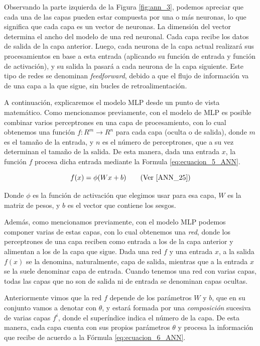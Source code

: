 \documentclass[12pt,a4paper]{article}
\begin{document}
\begin{sloppypar}
Observando la parte izquierda de la Figura \ref{fig:ann_3}, podemos apreciar que cada una de las capas pueden estar compuesta por una o más neuronas, lo que significa que cada capa es un vector de neuronas. La dimensión del vector determina el ancho del modelo de una red neuronal. Cada capa recibe los datos de salida de la capa anterior. Luego, cada neurona de la capa actual realizará sus procesamientos en base a esta entrada (aplicando su función de entrada y función de activación), y su salida la pasará a cada neurona de la capa siguiente. Este tipo de redes se denominan \textit{feedforward}, debido a que el flujo de información va de una capa a la que sigue, sin bucles de retroalimentación. 

A continuación, explicaremos el modelo MLP desde un punto de vista matemático\cite{ANN_25}. Como mencionamos previamente, con el modelo de MLP es posible combinar varios perceptrones en una capa de procesamiento, con lo cual obtenemos una función $f: R^m → R^n$ para cada capa (oculta o de salida), donde $m$ es el tamaño de la entrada, y $n$ es el número de perceptrones, que a su vez determinan el tamaño de la salida. De esta manera, dada una entrada $x$, la función $f$ procesa dicha entrada mediante la Formula \ref{eq:ecuacion_5_ANN}.

\begin{equation}\label{eq:ecuacion_5_ANN}
f(x) = \phi(Wx+b) \qquad  \text{(Ver \cite{ANN_25})}
\end{equation}

Donde $\phi$ es la función de activación que elegimos usar para esa capa, $W$ es la matriz de pesos, y $b$ es el vector que contiene los sesgos.

Además, como mencionamos previamente, con el modelo MLP podemos componer varias de estas capas, con lo cual obtenemos una \textit{red}, donde los perceptrones de una capa reciben como entrada a los de la capa anterior y alimentan a los de la capa que sigue. Dada una red $f$ y una entrada $x$, a la salida $f(x)$ se la denomina, naturalmente, capa de salida, mientras que a la entrada $x$ se la suele denominar capa de entrada. Cuando tenemos una red con varias capas, todas las capas que no son de salida ni de entrada se denominan capas ocultas. 

Anteriormente vimos que la red $f$ depende de los parámetros $W$ y $b$, que en su conjunto vamos a denotar con $\theta$, y estará formada por una \textit{composición} sucesiva de varias capas $f^i$, donde el superíndice indica el número de la capa. De esta manera, cada capa cuenta con sus propios parámetros $\theta$ y procesa la información que recibe de acuerdo a la Fórmula \ref{eq:ecuacion_6_ANN}.


\end{sloppypar}
\end{document}
